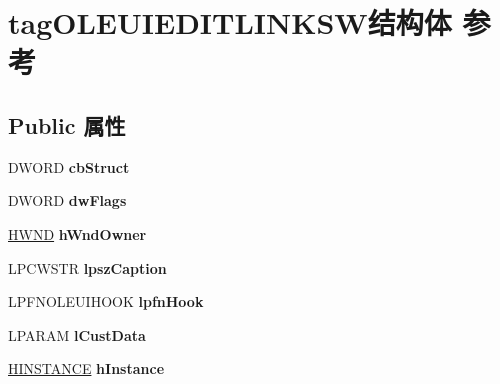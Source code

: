 \hypertarget{structtag_o_l_e_u_i_e_d_i_t_l_i_n_k_s_w}{}\section{tag\+O\+L\+E\+U\+I\+E\+D\+I\+T\+L\+I\+N\+K\+S\+W结构体 参考}
\label{structtag_o_l_e_u_i_e_d_i_t_l_i_n_k_s_w}
\subsection*{Public 属性}
\begin{DoxyCompactItemize}
\item 
\mbox{\label{structtag_o_l_e_u_i_e_d_i_t_l_i_n_k_s_w_a8487beb80708264d1665c2a7b1e84702}} 
D\+W\+O\+RD {\bfseries cb\+Struct}
\item 
\mbox{\label{structtag_o_l_e_u_i_e_d_i_t_l_i_n_k_s_w_a54c4b103c66776d4b1b7a7c35e259f69}} 
D\+W\+O\+RD {\bfseries dw\+Flags}
\item 
\mbox{\label{structtag_o_l_e_u_i_e_d_i_t_l_i_n_k_s_w_a823ffcc941b3fc5ca26bcb9b05b097ad}} 
\hyperlink{interfacevoid}{H\+W\+ND} {\bfseries h\+Wnd\+Owner}
\item 
\mbox{\label{structtag_o_l_e_u_i_e_d_i_t_l_i_n_k_s_w_a42a92eaef24e55d3fd9effd19b1bc5eb}} 
L\+P\+C\+W\+S\+TR {\bfseries lpsz\+Caption}
\item 
\mbox{\label{structtag_o_l_e_u_i_e_d_i_t_l_i_n_k_s_w_a6fa9804a138a7c21a8c9f9631975d83b}} 
L\+P\+F\+N\+O\+L\+E\+U\+I\+H\+O\+OK {\bfseries lpfn\+Hook}
\item 
\mbox{\label{structtag_o_l_e_u_i_e_d_i_t_l_i_n_k_s_w_a834774c980ff24d328013890172080bd}} 
L\+P\+A\+R\+AM {\bfseries l\+Cust\+Data}
\item 
\mbox{\label{structtag_o_l_e_u_i_e_d_i_t_l_i_n_k_s_w_a3681966d7ad8583134214bd2b31985a1}} 
\hyperlink{interfacevoid}{H\+I\+N\+S\+T\+A\+N\+CE} {\bfseries h\+Instance}

\end{DoxyCompactItemize}
